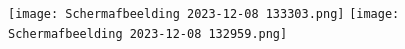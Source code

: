 \documentclass{article}
\begin{document}
	
%	
	\newline
	\texttt{[image: Schermafbeelding 2023-12-08 133303.png]}
	\newline
	\texttt{[image: Schermafbeelding 2023-12-08 132959.png]}
	
\end{document}
